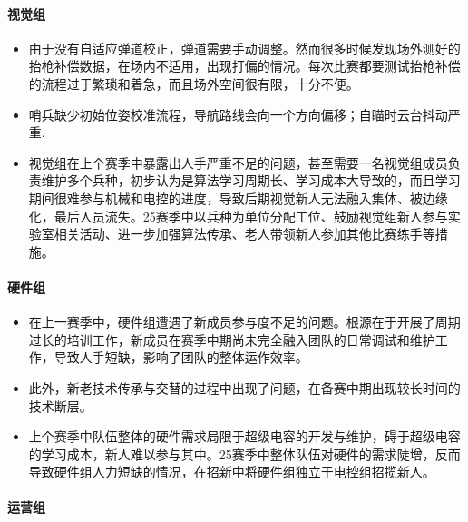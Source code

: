         \paragraph{视觉组}


            \begin{itemize}
                \item 由于没有自适应弹道校正，弹道需要手动调整。然而很多时候发现场外测好的抬枪补偿数据，在场内不适用，出现打偏的情况。每次比赛都要测试抬枪补偿的流程过于繁琐和着急，而且场外空间很有限，十分不便。
                \item 哨兵缺少初始位姿校准流程，导航路线会向一个方向偏移；自瞄时云台抖动严重.
                \item 视觉组在上个赛季中暴露出人手严重不足的问题，甚至需要一名视觉组成员负责维护多个兵种，初步认为是算法学习周期长、学习成本大导致的，而且学习期间很难参与机械和电控的进度，导致后期视觉新人无法融入集体、被边缘化，最后人员流失。25赛季中以兵种为单位分配工位、鼓励视觉组新人参与实验室相关活动、进一步加强算法传承、老人带领新人参加其他比赛练手等措施。
            \end{itemize}

        \paragraph{硬件组}


            \begin{itemize}
                \item 在上一赛季中，硬件组遭遇了新成员参与度不足的问题。根源在于开展了周期过长的培训工作，新成员在赛季中期尚未完全融入团队的日常调试和维护工作，导致人手短缺，影响了团队的整体运作效率。
                \item 此外，新老技术传承与交替的过程中出现了问题，在备赛中期出现较长时间的技术断层。
                \item 上个赛季中队伍整体的硬件需求局限于超级电容的开发与维护，碍于超级电容的学习成本，新人难以参与其中。25赛季中整体队伍对硬件的需求陡增，反而导致硬件组人力短缺的情况，在招新中将硬件组独立于电控组招揽新人。
            \end{itemize}

        \paragraph{运营组}

